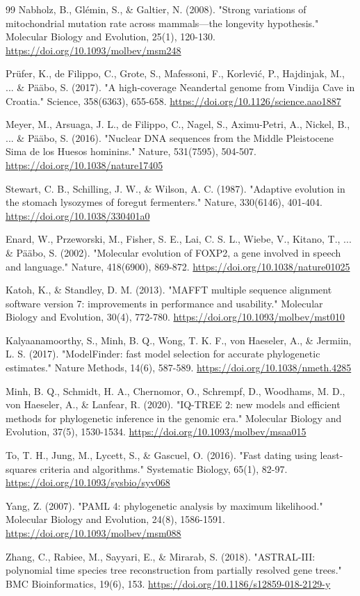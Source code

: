 \documentclass[10pt,letterpaper]{article}
\begin{document}
\begin{thebibliography}{99}
 Nabholz, B., Gl\'emin, S., \& Galtier, N. (2008). "Strong variations of mitochondrial mutation rate across mammals---the longevity hypothesis." Molecular Biology and Evolution, 25(1), 120-130. \url{https://doi.org/10.1093/molbev/msm248}

 Pr\"ufer, K., de Filippo, C., Grote, S., Mafessoni, F., Korlevi\'c, P., Hajdinjak, M., ... \& P\"a\"abo, S. (2017). "A high-coverage Neandertal genome from Vindija Cave in Croatia." Science, 358(6363), 655-658. \url{https://doi.org/10.1126/science.aao1887}

 Meyer, M., Arsuaga, J. L., de Filippo, C., Nagel, S., Aximu-Petri, A., Nickel, B., ... \& P\"a\"abo, S. (2016). "Nuclear DNA sequences from the Middle Pleistocene Sima de los Huesos hominins." Nature, 531(7595), 504-507. \url{https://doi.org/10.1038/nature17405}

 Stewart, C. B., Schilling, J. W., \& Wilson, A. C. (1987). "Adaptive evolution in the stomach lysozymes of foregut fermenters." Nature, 330(6146), 401-404. \url{https://doi.org/10.1038/330401a0}

 Enard, W., Przeworski, M., Fisher, S. E., Lai, C. S. L., Wiebe, V., Kitano, T., ... \& P\"a\"abo, S. (2002). "Molecular evolution of FOXP2, a gene involved in speech and language." Nature, 418(6900), 869-872. \url{https://doi.org/10.1038/nature01025}

 Katoh, K., \& Standley, D. M. (2013). "MAFFT multiple sequence alignment software version 7: improvements in performance and usability." Molecular Biology and Evolution, 30(4), 772-780. \url{https://doi.org/10.1093/molbev/mst010}

 Kalyaanamoorthy, S., Minh, B. Q., Wong, T. K. F., von Haeseler, A., \& Jermiin, L. S. (2017). "ModelFinder: fast model selection for accurate phylogenetic estimates." Nature Methods, 14(6), 587-589. \url{https://doi.org/10.1038/nmeth.4285}

 Minh, B. Q., Schmidt, H. A., Chernomor, O., Schrempf, D., Woodhams, M. D., von Haeseler, A., \& Lanfear, R. (2020). "IQ-TREE 2: new models and efficient methods for phylogenetic inference in the genomic era." Molecular Biology and Evolution, 37(5), 1530-1534. \url{https://doi.org/10.1093/molbev/msaa015}

 To, T. H., Jung, M., Lycett, S., \& Gascuel, O. (2016). "Fast dating using least-squares criteria and algorithms." Systematic Biology, 65(1), 82-97. \url{https://doi.org/10.1093/sysbio/syv068}

 Yang, Z. (2007). "PAML 4: phylogenetic analysis by maximum likelihood." Molecular Biology and Evolution, 24(8), 1586-1591. \url{https://doi.org/10.1093/molbev/msm088}

 Zhang, C., Rabiee, M., Sayyari, E., \& Mirarab, S. (2018). "ASTRAL-III: polynomial time species tree reconstruction from partially resolved gene trees." BMC Bioinformatics, 19(6), 153. \url{https://doi.org/10.1186/s12859-018-2129-y}
\end{thebibliography}
\end{document}
